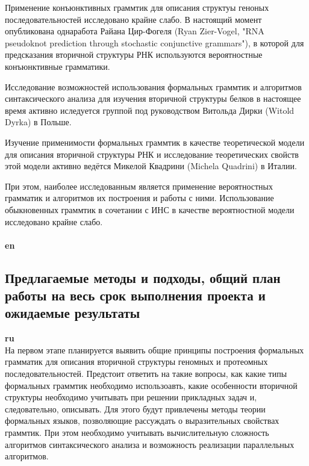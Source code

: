﻿\documentclass[12pt]{article}  %
\theoremstyle{remark}
\begin{document}
Применение конъюнктивных граммтик для описания структуы геноных последовательностей исследовано крайне слабо.
В настоящий момент опубликована однаработа Райана Цир-Фогеля (Ryan Zier-Vogel, "RNA pseudoknot prediction through stochastic conjunctive grammars"), в которой для предсказания вторичной структуры РНК используются вероятностные конъюнктивные грамматики.

Исследование возможностей использования формальных граммтик и алгоритмов синтаксического анализа для изучения вторичной структуры белков в настоящее время активно иследуется группой под руководством Витольда Дирки (Witold Dyrka) в Польше.

Изучение применимости формальных граммтик в качестве теоретической модели для описания вторичной структуры РНК и исследование теоретических свойств этой модели активно ведётся Микелой Квадрини (Michela Quadrini) в Италии.

При этом, наиболее исследованным является применение вероятностных грамматик и алгоритмов их построения и работы с ними.
Использование обыкновенных граммтик в сочетании с ИНС в качестве вероятностной модели исследовано крайне слабо.
\\
\\
\textbf{en}\\



\subsection{Предлагаемые методы и подходы, общий план работы на весь срок выполнения проекта и ожидаемые результаты }

\textbf{ru}\\
На первом этапе планируется выявить общие принципы построения формальных грамматик для описания вторичной структуры геномных и протеомных последовательностей.
Предстоит ответить на такие вопросы, как какие типы формальных граммтик необходимо использоавть, какие особенности вторичной структуры необходимо учитывать при решении прикладных задач и, следовательно, описывать.
Для этого будут привлечены методы теории формальных языков, позволяющие рассуждать о выразительных свойствах граммтик.
При этом необходимо учитывать вычислительную сложность алгоритмов синтаксического анализа и возможность реализации параллельных алгоритмов.
\end{document}
